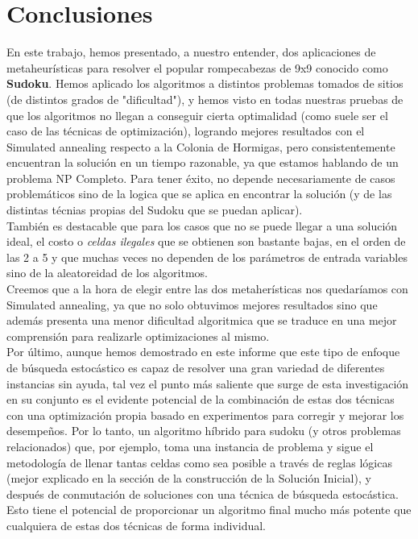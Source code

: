 \section{Conclusiones}

En este trabajo, hemos presentado, a nuestro entender, dos aplicaciones de metaheurísticas para resolver el popular rompecabezas de 9x9 conocido como \textbf{Sudoku}. Hemos aplicado los algoritmos a distintos problemas tomados de sitios (de distintos grados de "dificultad"), y hemos visto en todas nuestras pruebas de que los algoritmos no llegan a conseguir cierta optimalidad (como suele ser el caso de las técnicas de optimización), logrando mejores resultados con el Simulated annealing respecto a la Colonia de Hormigas, pero consistentemente encuentran la solución en un tiempo razonable, ya que estamos hablando de un problema NP Completo. Para tener éxito, no depende necesariamente de casos problemáticos sino de la logica que se aplica en encontrar la solución (y de las distintas técnias propias del Sudoku que se puedan aplicar).\\
También es destacable que para los casos que no se puede llegar a una solución ideal, el costo o \textit{celdas ilegales} que se obtienen son bastante bajas, en el orden de las 2 a 5 y que muchas veces no dependen de los parámetros de entrada variables sino de la aleatoreidad de los algoritmos. \\
Creemos que a la hora de elegir entre las dos metaherísticas nos quedaríamos con Simulated annealing, ya que no solo obtuvimos mejores resultados sino que además presenta una menor dificultad algoritmica que se traduce en una mejor comprensión para realizarle optimizaciones al mismo. \\
Por último, aunque hemos demostrado en este informe que este tipo de enfoque de búsqueda estocástico es capaz de resolver una gran variedad de diferentes instancias sin ayuda, tal vez el punto más saliente que surge de esta investigación en su conjunto es el evidente potencial de la combinación de estas dos técnicas con una optimización propia basado en experimentos para corregir y mejorar los desempeños.  Por lo tanto, un algoritmo híbrido para sudoku (y otros problemas relacionados) que, por ejemplo, toma una instancia de problema y sigue el metodología de  llenar tantas celdas como sea posible a través de reglas lógicas (mejor explicado en la sección de la construcción de la Solución Inicial), y después de conmutación de soluciones con una técnica de búsqueda estocástica. Esto tiene el potencial de proporcionar un algoritmo final mucho más potente que cualquiera de estas dos técnicas de forma individual. 

